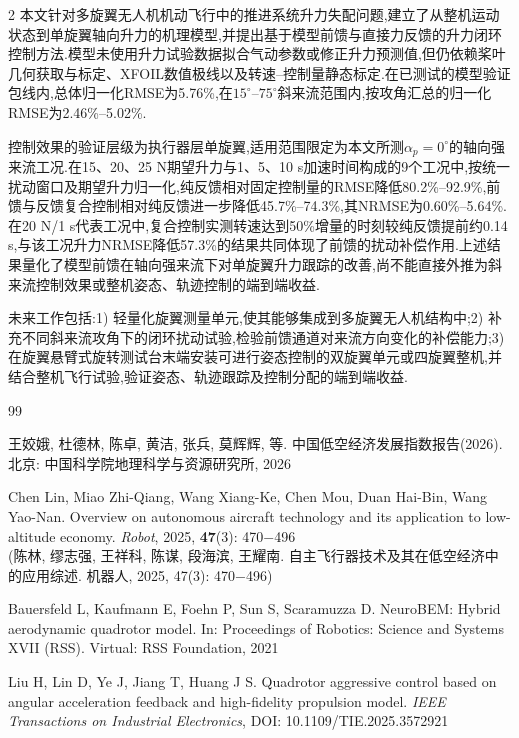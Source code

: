 \documentclass{aas}
\begin{document}
\begin{multicols}{2}
本文针对多旋翼无人机机动飞行中的推进系统升力失配问题,建立了从整机运动状态到单旋翼轴向升力的机理模型,并提出基于模型前馈与直接力反馈的升力闭环控制方法.模型未使用升力试验数据拟合气动参数或修正升力预测值,但仍依赖桨叶几何获取与标定、XFOIL数值极线以及转速--控制量静态标定.在已测试的模型验证包线内,总体归一化RMSE为5.76\%,在$15^{\circ}$--$75^{\circ}$斜来流范围内,按攻角汇总的归一化RMSE为2.46\%--5.02\%.

控制效果的验证层级为执行器层单旋翼,适用范围限定为本文所测$\alpha_p=0^{\circ}$的轴向强来流工况.在15、20、25 N期望升力与1、5、10 s加速时间构成的9个工况中,按统一扰动窗口及期望升力归一化,纯反馈相对固定控制量的RMSE降低80.2\%--92.9\%,前馈与反馈复合控制相对纯反馈进一步降低45.7\%--74.3\%,其NRMSE为0.60\%--5.64\%.在20 N/1 s代表工况中,复合控制实测转速达到50\%增量的时刻较纯反馈提前约0.14 s,与该工况升力NRMSE降低57.3\%的结果共同体现了前馈的扰动补偿作用.上述结果量化了模型前馈在轴向强来流下对单旋翼升力跟踪的改善,尚不能直接外推为斜来流控制效果或整机姿态、轨迹控制的端到端收益.

未来工作包括:1) 轻量化旋翼测量单元,使其能够集成到多旋翼无人机结构中;2) 补充不同斜来流攻角下的闭环扰动试验,检验前馈通道对来流方向变化的补偿能力;3) 在旋翼悬臂式旋转测试台末端安装可进行姿态控制的双旋翼单元或四旋翼整机,并结合整机飞行试验,验证姿态、轨迹跟踪及控制分配的端到端收益.

\begin{thebibliography}{99}
 \addtolength{\itemsep}{0.2em} 

 王姣娥, 杜德林, 陈卓, 黄洁, 张兵, 莫辉辉, 等. 中国低空经济发展指数报告(2026). 北京: 中国科学院地理科学与资源研究所, 2026

 Chen Lin, Miao Zhi-Qiang, Wang Xiang-Ke, Chen Mou, Duan Hai-Bin, Wang Yao-Nan. Overview on autonomous aircraft technology and its application to low-altitude economy. {\sl Robot}, 2025, {\bf 47}(3): 470$-$496 \\
(陈林, 缪志强, 王祥科, 陈谋, 段海滨, 王耀南. 自主飞行器技术及其在低空经济中的应用综述. 机器人, 2025, 47(3): 470$-$496)

 Bauersfeld L, Kaufmann E, Foehn P, Sun S, Scaramuzza D. NeuroBEM: Hybrid aerodynamic quadrotor model. In: Proceedings of Robotics: Science and Systems XVII (RSS). Virtual: RSS Foundation, 2021

 Liu H, Lin D, Ye J, Jiang T, Huang J S. Quadrotor aggressive control based on angular acceleration feedback and high-fidelity propulsion model. {\sl IEEE Transactions on Industrial Electronics}, DOI: 10.1109/TIE.2025.3572921


\end{thebibliography}
\end{multicols}
\end{document}
